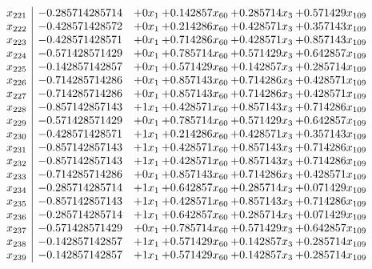 \documentclass[11pt]{article}
\begin{document}
\[\begin{array}{c| c c@{\hskip 2pt} c@{\hskip 2pt} c@{\hskip 2pt} c@{\hskip 2pt} }
 x_{221}   &  -0.285714285714 & + 0 x_{1} & + 0.142857 x_{60} & + 0.285714 x_{3} & + 0.571429 x_{109}\\
 x_{222}   &  -0.428571428572 & + 0 x_{1} & + 0.214286 x_{60} & + 0.428571 x_{3} & + 0.357143 x_{109}\\
 x_{223}   &  -0.428571428571 & + 0 x_{1} & + 0.714286 x_{60} & + 0.428571 x_{3} & + 0.857143 x_{109}\\
 x_{224}   &  -0.571428571429 & + 0 x_{1} & + 0.785714 x_{60} & + 0.571429 x_{3} & + 0.642857 x_{109}\\
 x_{225}   &  -0.142857142857 & + 0 x_{1} & + 0.571429 x_{60} & + 0.142857 x_{3} & + 0.285714 x_{109}\\
 x_{226}   &  -0.714285714286 & + 0 x_{1} & + 0.857143 x_{60} & + 0.714286 x_{3} & + 0.428571 x_{109}\\
 x_{227}   &  -0.714285714286 & + 0 x_{1} & + 0.857143 x_{60} & + 0.714286 x_{3} & + 0.428571 x_{109}\\
 x_{228}   &  -0.857142857143 & + 1 x_{1} & + 0.428571 x_{60} & + 0.857143 x_{3} & + 0.714286 x_{109}\\
 x_{229}   &  -0.571428571429 & + 0 x_{1} & + 0.785714 x_{60} & + 0.571429 x_{3} & + 0.642857 x_{109}\\
 x_{230}   &  -0.428571428571 & + 1 x_{1} & + 0.214286 x_{60} & + 0.428571 x_{3} & + 0.357143 x_{109}\\
 x_{231}   &  -0.857142857143 & + 1 x_{1} & + 0.428571 x_{60} & + 0.857143 x_{3} & + 0.714286 x_{109}\\
 x_{232}   &  -0.857142857143 & + 1 x_{1} & + 0.428571 x_{60} & + 0.857143 x_{3} & + 0.714286 x_{109}\\
 x_{233}   &  -0.714285714286 & + 0 x_{1} & + 0.857143 x_{60} & + 0.714286 x_{3} & + 0.428571 x_{109}\\
 x_{234}   &  -0.285714285714 & + 1 x_{1} & + 0.642857 x_{60} & + 0.285714 x_{3} & + 0.071429 x_{109}\\
 x_{235}   &  -0.857142857143 & + 1 x_{1} & + 0.428571 x_{60} & + 0.857143 x_{3} & + 0.714286 x_{109}\\
 x_{236}   &  -0.285714285714 & + 1 x_{1} & + 0.642857 x_{60} & + 0.285714 x_{3} & + 0.071429 x_{109}\\
 x_{237}   &  -0.571428571429 & + 0 x_{1} & + 0.785714 x_{60} & + 0.571429 x_{3} & + 0.642857 x_{109}\\
 x_{238}   &  -0.142857142857 & + 1 x_{1} & + 0.571429 x_{60} & + 0.142857 x_{3} & + 0.285714 x_{109}\\
 x_{239}   &  -0.142857142857 & + 1 x_{1} & + 0.571429 x_{60} & + 0.142857 x_{3} & + 0.285714 x_{109}\\

\end{array}\]
\end{document}
